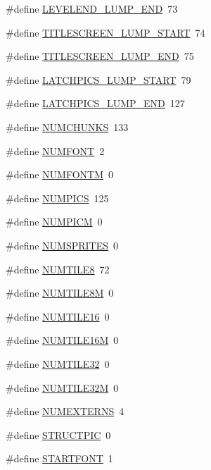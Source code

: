 \begin{DoxyCompactItemize}
\item 
\#define \hyperlink{GFXV__SDM_8H_a01e5f4d5f8e05beb4315b9ad907e06e7}{LEVELEND\_\-LUMP\_\-END}~73
\item 
\#define \hyperlink{GFXV__SDM_8H_a7a3b353d78a22edb2141bfde582d15cc}{TITLESCREEN\_\-LUMP\_\-START}~74
\item 
\#define \hyperlink{GFXV__SDM_8H_aa2ea9b3993d1853ba97b4baef70e7d4f}{TITLESCREEN\_\-LUMP\_\-END}~75
\item 
\#define \hyperlink{GFXV__SDM_8H_a88207d485bad504249067e714794e823}{LATCHPICS\_\-LUMP\_\-START}~79
\item 
\#define \hyperlink{GFXV__SDM_8H_a366d7af9e92d0a7d4ee631d44c4ecbf7}{LATCHPICS\_\-LUMP\_\-END}~127
\item 
\#define \hyperlink{GFXV__SDM_8H_a06c8b188cc3cdd25a5451beeefddfa66}{NUMCHUNKS}~133
\item 
\#define \hyperlink{GFXV__SDM_8H_a7686ac8ed1dbf71ebee2b4711dae0edd}{NUMFONT}~2
\item 
\#define \hyperlink{GFXV__SDM_8H_afd7a523b060f425fd737a94c044892ac}{NUMFONTM}~0
\item 
\#define \hyperlink{GFXV__SDM_8H_a437727f0f1480aff6a1437f8881e2241}{NUMPICS}~125
\item 
\#define \hyperlink{GFXV__SDM_8H_a2eb878497ab6b2a4f80015a218f38c8f}{NUMPICM}~0
\item 
\#define \hyperlink{GFXV__SDM_8H_ac7e5f97c96cc0101c6f998c7010813a3}{NUMSPRITES}~0
\item 
\#define \hyperlink{GFXV__SDM_8H_a1ad83311a1b6300dcac06636eb1d03b4}{NUMTILE8}~72
\item 
\#define \hyperlink{GFXV__SDM_8H_a99d75e9d203bae79464f2ecd3fd31b8d}{NUMTILE8M}~0
\item 
\#define \hyperlink{GFXV__SDM_8H_a64d23288f15517babe845b31bebdf108}{NUMTILE16}~0
\item 
\#define \hyperlink{GFXV__SDM_8H_a80bd5aa78c52471ba88d9d15baeb5e44}{NUMTILE16M}~0
\item 
\#define \hyperlink{GFXV__SDM_8H_a63d2fe64d989433ecd39d601070bfe04}{NUMTILE32}~0
\item 
\#define \hyperlink{GFXV__SDM_8H_ac85fdf79a513ee60e10cbb347ba5129f}{NUMTILE32M}~0
\item 
\#define \hyperlink{GFXV__SDM_8H_abb86554baf24d8863e54bf20d68120b5}{NUMEXTERNS}~4
\item 
\#define \hyperlink{GFXV__SDM_8H_aa325a0ff072fddd0404951d4f486fcaa}{STRUCTPIC}~0
\item 
\#define \hyperlink{GFXV__SDM_8H_a91e546d8307de206a3822f7ea9064cb2}{STARTFONT}~1

\end{DoxyCompactItemize}
